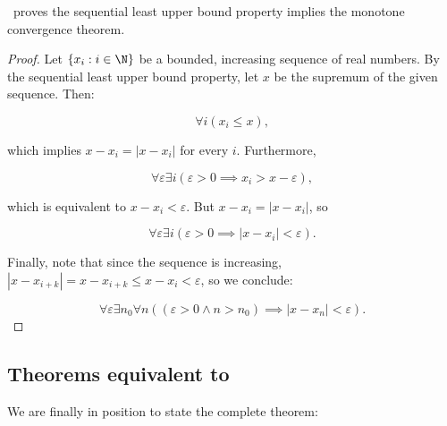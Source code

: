 \documentclass[../main.tex]{memoir}
\begin{document}
\begin{theorem}
  \label{thm:lub-mc}
  \rca\ proves the sequential least upper bound property implies the monotone convergence theorem.
\end{theorem}
\begin{proof}
  Let $\{x_i: i \in \N\}$ be a bounded, increasing sequence of real numbers. By the sequential least upper bound property, let $x$ be the supremum of the given sequence. Then:

  \[ \forall i (x_i \le x), \]

  which implies $x - x_i = |x - x_i|$ for every $i$. Furthermore,

  \[ \forall \varepsilon \exists i (\varepsilon > 0 \implies x_i > x - \varepsilon), \]

  which is equivalent to $x - x_i < \varepsilon$. But $x - x_i = |x - x_i|$, so

  \[ \forall \varepsilon \exists i (\varepsilon > 0 \implies |x - x_i| < \varepsilon). \]

  Finally, note that since the sequence is increasing, $|x - x_{i + k}| = x - x_{i + k} \le x - x_i < \varepsilon$, so we conclude:

  \[ \forall \varepsilon \exists n_0 \forall n ((\varepsilon > 0 \land n > n_0) \implies |x - x_n| < \varepsilon). \]
\end{proof}

\subsection{Theorems equivalent to \aca}

We are finally in position to state the complete theorem:
\end{document}
